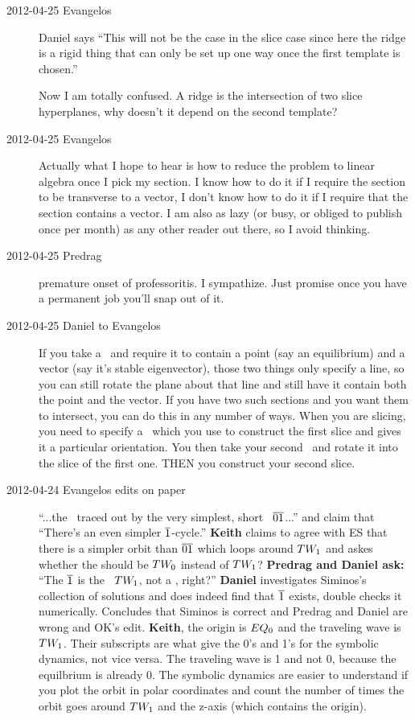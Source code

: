 \begin{description}
\item[2012-04-25 Evangelos] Daniel says ``This will not be the case in the slice
case since here the ridge is a rigid thing that can only be set up one way once
the first template is chosen.''

Now I am totally confused. A ridge is the intersection of two slice hyperplanes,
why doesn't it depend on the second template?

\item[2012-04-25 Evangelos] Actually what I hope to hear is how to reduce the
problem to linear algebra once I pick my section. I know how to do it if
I require the section to be transverse to a vector, I don't know how to do it
if I require that the section contains a vector. I am also as lazy (or busy,
or obliged to publish once per month) as any other reader out there,
so I avoid thinking.

\item[2012-04-25 Predrag] premature onset of professoritis. I sympathize.
Just promise once you have a permanent job you'll snap out of it.

\item[2012-04-25 Daniel to Evangelos] If you take a \PoincSec\ and
require it to contain a point (say an equilibrium) and a vector (say it's
stable eigenvector), those two things only specify a line, so you can
still rotate the plane about that line and still have it contain both the
point and the vector. If you have two such sections and you want them to
intersect, you can do this in any number of ways. When you are slicing,
you need to specify a \template\, which you use to construct the first
slice and gives it a particular orientation. You then take your second
\template\ and rotate it into the slice of the first one. THEN you
construct your second slice.

\item[2012-04-24 Evangelos edits on paper] ``...the \wurst\ traced out by
 the very simplest, short \rpo\ $\overline{01}$...'' and
claim that ``There's an even simpler $\overline{1}$-cycle.'' {\bf Keith}
claims to agree with ES that there is a simpler orbit than $\overline{01}$
which loops around $TW_{1}$  and askes whether the \reqv should be
$TW_{0}$ instead of $TW_{1}$? {\bf Predrag and Daniel ask:} ``The
$\overline{1}$ is the \reqv\ $TW_{1}$, not a \rpo, right?'' {\bf Daniel}
investigates Siminos's collection of solutions and does indeed find that
$\overline{1}$ exists, double checks it numerically. Concludes that Siminos
is correct and Predrag and Daniel are wrong and OK's edit. {\bf Keith},
the origin is $EQ_{0}$ and the traveling wave is $TW_{1}$. Their
subscripts are what give the 0's and 1's for the symbolic dynamics, not
vice versa. The traveling wave is 1 and not 0, because the equilbrium is
already 0. The symbolic dynamics are easier to understand if you plot the
orbit in polar coordinates and count the number of times the orbit goes
around $TW_{1}$ and the z-axis (which contains the origin).


\end{description}
